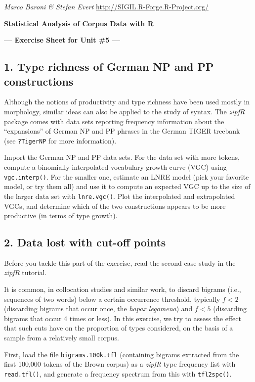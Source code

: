 \documentclass[a4paper,12pt]{article}
\begin{document}
\emph{Marco Baroni \& Stefan Evert} \hfill %
{\small \url{http://SIGIL.R-Forge.R-Project.org/}}

\begin{center}
  \textbf{\large Statistical Analysis of Corpus Data with R}

  \textbf{\large --- Exercise Sheet for Unit \#5 ---}
\end{center}

\subsection*{1. Type richness of German NP and PP constructions}

Although the notions of productivity and type richness have been used mostly
in morphology, similar ideas can also be applied to the study of syntax.  The
\emph{zipfR} package comes with data sets reporting frequency information
about the ``expansions'' of German NP and PP phrases in the German TIGER
treebank (see \texttt{?TigerNP} for more information).

Import the German NP and PP data sets. For the data set with more tokens,
compute a binomially interpolated vocabulary growth curve (VGC) using \texttt{vgc.interp()}.  
For the smaller one, estimate an LNRE model (pick your favorite model, or try them
all) and use it to compute an expected VGC up to the size of the larger data
set with \texttt{lnre.vgc()}.  Plot the interpolated and extrapolated VGCs, and determine which of the
two constructions appears to be more productive (in terms of type growth).


\subsection*{2. Data lost with cut-off points}

Before you tackle this part of the exercise, read the second case study in
the \emph{zipfR} tutorial.

It is common, in collocation studies and similar work, to discard bigrams
(i.e., sequences of two words) below a certain occurrence threshold, typically
$f < 2$ (discarding bigrams that occur once, the \emph{hapax legomena}) and $f
< 5$ (discarding bigrams that occur 4 times or less).  In this exercise, we
try to assess the effect that such cuts have on the proportion of types
considered, on the basis of a sample from a relatively small corpus.

First, load the file \texttt{bigrams.100k.tfl} (containing bigrams extracted
from the first 100,000 tokens of the Brown corpus) as a \emph{zipfR} type
frequency list with \texttt{read.tfl()}, and generate a frequency spectrum from this 
with \texttt{tfl2spc()}.
\end{document}
